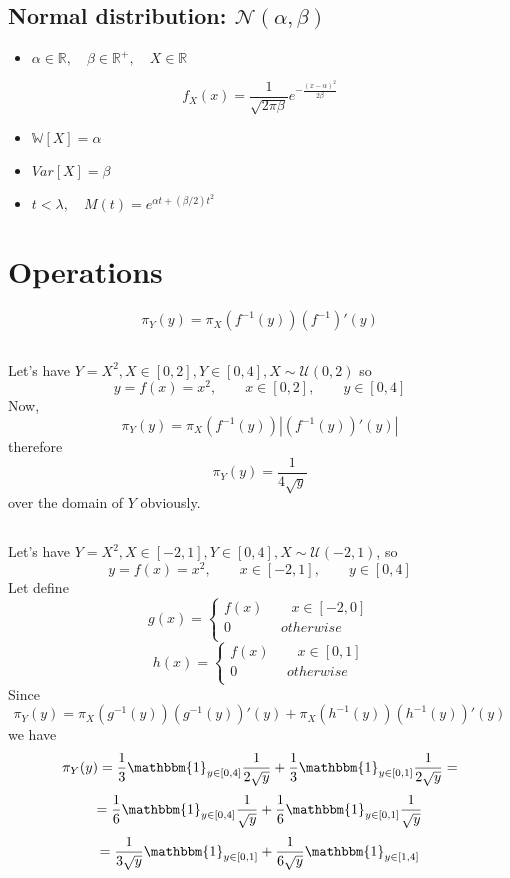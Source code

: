 \documentclass[12pt]{article}
\begin{document}
\subsection{Normal distribution: $\mathcal{N}(\alpha, \beta)$}
\begin{itemize}
	\item $\alpha\in \mathbb{R},\quad \beta\in \mathbb{R}^+,\quad X\in \mathbb{R}$
\end{itemize}
$$f_X(x)=\frac{1}{\sqrt{2\pi\beta}}e^{-\frac{(x-\alpha)^2}{2\beta}}$$
\begin{itemize}
	\item $\mathbb{W}[X]=\alpha$
	\item $Var[X]=\beta$
	\item $t<\lambda,\quad M(t)=e^{\alpha t+(\beta/2)t^2}$
\end{itemize}

\clearpage
\section{Operations}
$$\pi_Y(y) =\pi_X(f^{-1}(y))(f^{-1})'(y)$$
\subsection{}
Let's have $Y=X^2, X\in[0,2],Y\in[0,4], X\sim \mathcal{U}(0,2)$ so 
$$y=f(x)=x^2,\qquad x\in[0,2],\qquad y\in[0,4]$$
Now, $$\pi_Y(y)=\pi_X(f^{-1}(y))|(f^{-1}(y))'(y)|$$
therefore
$$\pi_Y(y) = \frac{1}{4\sqrt{y}}$$
over the domain of $Y$ obviously.
\subsection{}
Let's have $Y=X^2, X\in[-2,1], Y\in [0,4], X\sim \mathcal{U}(-2,1)$,  so 
$$y=f(x)=x^2,\qquad x\in[-2,1],\qquad y\in[0,4]$$
Let define 
\[   
g(x) = 
\begin{cases}
	f(x)\qquad x\in [-2,0]\\
	0\qquad \;\;\quad otherwise\\ 
\end{cases}
\]
\[   
h(x) = 
\begin{cases}
	f(x)\qquad x\in [0,1]\\
	0\qquad \;\;\quad otherwise\\ 
\end{cases}
\]
Since
 $$\pi_Y(y)=\pi_X(g^{-1}(y))(g^{-1}(y))'(y)+\pi_X(h^{-1}(y))(h^{-1}(y))'(y)$$
we have
$$\pi_Y(y)=\frac{1}{3}\mathbbm{1}_{y\in[0,4]}\frac{1}{2\sqrt{y}}+\frac{1}{3}\mathbbm{1}_{y\in[0,1]}\frac{1}{2\sqrt{y}}=$$
$$=\frac{1}{6}\mathbbm{1}_{y\in[0,4]}\frac{1}{\sqrt{y}}+\frac{1}{6}\mathbbm{1}_{y\in[0,1]}\frac{1}{\sqrt{y}}$$
$$=\frac{1}{3\sqrt{y}}\mathbbm{1}_{y\in[0,1]}+\frac{1}{6\sqrt{y}}\mathbbm{1}_{y\in[1,4]}$$
\end{document}
